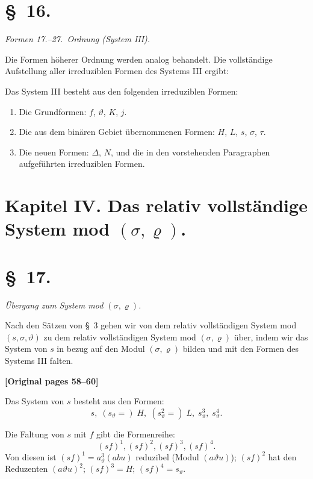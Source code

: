 \documentclass[12pt,a4paper]{article}
\begin{document}
\section*{\S\ 16.}

\textit{Formen 17.--27.\ Ordnung (System III).}

Die Formen höherer Ordnung werden analog behandelt. Die vollständige Aufstellung aller irreduziblen Formen des Systems III ergibt:

Das System III besteht aus den folgenden irreduziblen Formen:
\begin{enumerate}
\item[1.] Die Grundformen: $f$, $\vartheta$, $K$, $j$.
\item[2.] Die aus dem binären Gebiet übernommenen Formen: $H$, $L$, $s$, $\sigma$, $\tau$.
\item[3.] Die neuen Formen: $\varDelta$, $N$, und die in den vorstehenden Paragraphen aufgeführten irreduziblen Formen.
\end{enumerate}

\section*{Kapitel IV. Das relativ vollständige System mod $(\sigma, \varrho)$.}

\section*{\S\ 17.}

\textit{Übergang zum System mod $(\sigma, \varrho)$.}

Nach den Sätzen von \S\ 3 gehen wir von dem relativ vollständigen System mod $(s, \sigma, \vartheta)$ zu dem relativ vollständigen System mod $(\sigma, \varrho)$ über, indem wir das System von $s$ in bezug auf den Modul $(\sigma, \varrho)$ bilden und mit den Formen des Systems III falten.

\noindent\textbf{[Original pages 58--60]}

Das System von $s$ besteht aus den Formen:
\[s, \; (s_\vartheta =) \; H, \; (s_\vartheta^2 =) \; L, \; s_\vartheta^3, \; s_\vartheta^4.\]

Die Faltung von $s$ mit $f$ gibt die Formenreihe:
\[(sf)^1, (sf)^2, (sf)^3, (sf)^4.\]
Von diesen ist $(sf)^1 = a_\vartheta^3(abu)$ reduzibel (Modul $(a\vartheta u)$); $(sf)^2$ hat den Reduzenten $(a\vartheta u)^2$; $(sf)^3 = H$; $(sf)^4 = s_\vartheta$.
\end{document}
